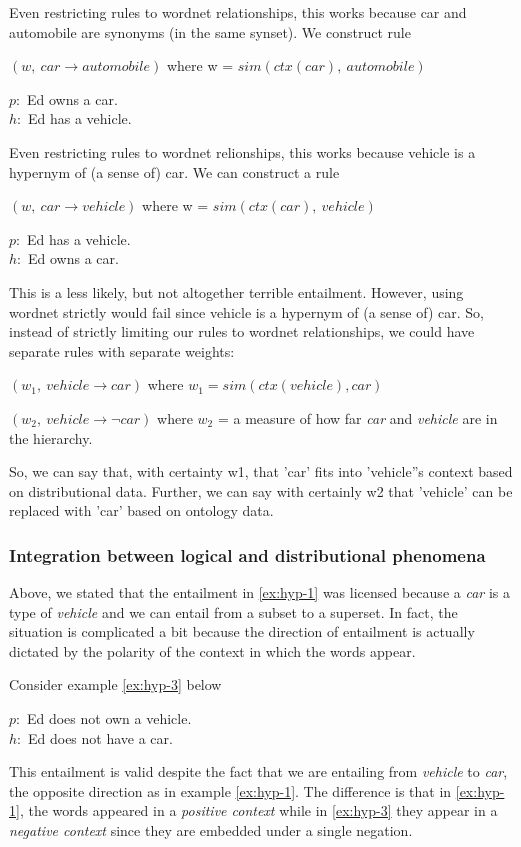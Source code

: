 Even restricting rules to wordnet relationships, this works because car and
automobile are synonyms (in the same synset).
We construct rule 

$(w,~ car \to automobile)$ where w = $sim(ctx(car),~ automobile)$


\begin{example}\label{ex:hyp-1}
$p:$ Ed owns a car. \\
$h:$ Ed has a vehicle.
\end{example}

Even restricting rules to wordnet relionships, this works because vehicle is a
hypernym of (a sense of) car.
We can construct a rule 

$(w,~ car \to vehicle)$ where w = $sim(ctx(car),~ vehicle)$

\begin{example}\label{ex:hyp-2}
$p:$ Ed has a vehicle. \\
$h:$ Ed owns a car.
\end{example}

This is a less likely, but not altogether terrible entailment.
However, using wordnet strictly would fail since vehicle is a hypernym of (a
sense of) car.
So, instead of strictly limiting our rules to wordnet relationships, we could
have separate rules with separate weights:

$(w_1,~ vehicle \to car)$ where $w_1 = sim(ctx(vehicle), car)$ 

$(w_2,~ vehicle \to \lnot car)$ where $w_2$ = a measure of how far {\it car} and
{\it vehicle} are in the hierarchy.

So, we can say that, with certainty w1, that 'car' fits into 'vehicle''s context
based on distributional data.
Further, we can say with certainly w2 that 'vehicle' can be replaced with 'car'
based on ontology data.



\subsubsection*{Integration between logical and distributional phenomena}

Above, we stated that the entailment in \eqref{ex:hyp-1} was licensed because a
{\it car} is a type of {\it vehicle} and we can entail from a subset to a
superset.  In fact, the situation is complicated a bit because the direction of
entailment is actually dictated by the polarity of the context in which the
words appear.

Consider example \eqref{ex:hyp-3} below
\begin{example}\label{ex:hyp-3}
$p:$ Ed does not own a vehicle. \\
$h:$ Ed does not have a car.
\end{example}
This entailment is valid despite the fact that we are entailing from {\it
vehicle} to {\it car}, the opposite direction as in example \eqref{ex:hyp-1}. 
The difference is that in \eqref{ex:hyp-1}, the words appeared in a {\it
positive context} while in \eqref{ex:hyp-3} they appear in a {\it
negative context} since they are embedded under a single negation.

